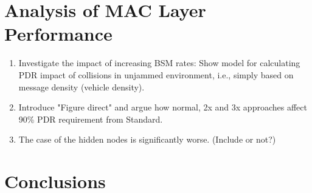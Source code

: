 \documentclass[runningheads,a4paper]{llncs}
\begin{document}
\section{Analysis of MAC Layer Performance}
\begin{enumerate}
	\item Investigate the impact of increasing BSM rates: 
	\subitem Show model for calculating PDR impact of collisions in unjammed environment, i.e., simply based on message density (vehicle density).
	\item Introduce "Figure direct" and argue how normal, 2x and 3x approaches affect 90\% PDR requirement from Standard.
	\item The case of the hidden nodes is significantly worse. (Include or not?)
\end{enumerate}

\section{Conclusions}



%
\end{document}
